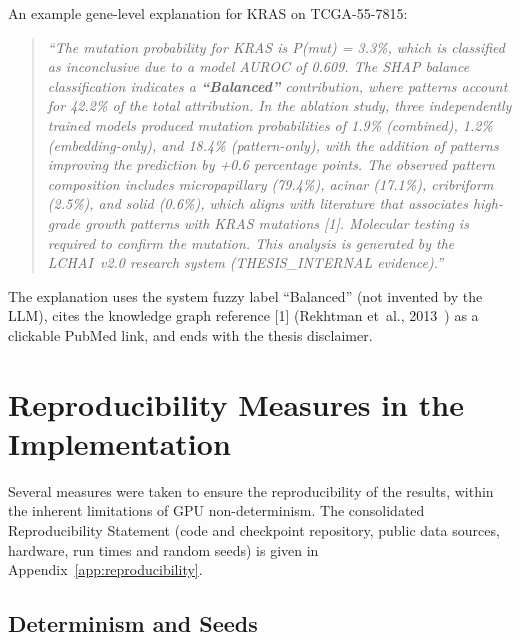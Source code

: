 An example gene-level explanation for KRAS on TCGA-55-7815:
\begin{quote}
\emph{``The mutation probability for KRAS is P(mut) = 3.3\%, which
is classified as inconclusive due to a model AUROC of 0.609.
The SHAP balance classification indicates a \textbf{``Balanced''}
contribution, where patterns account for 42.2\% of the total
attribution.
In the ablation study, three independently trained models produced
mutation probabilities of 1.9\% (combined), 1.2\% (embedding-only),
and 18.4\% (pattern-only), with the addition of patterns improving
the prediction by +0.6 percentage points.
The observed pattern composition includes micropapillary (79.4\%),
acinar (17.1\%), cribriform (2.5\%), and solid (0.6\%),
which aligns with literature that associates high-grade growth patterns
with KRAS mutations [1].
Molecular testing is required to confirm the mutation.
This analysis is generated by the LCHAI~v2.0 research system
(THESIS\_INTERNAL evidence).''}
\end{quote}

The explanation uses the system fuzzy label ``Balanced'' (not
invented by the LLM), cites the knowledge graph reference [1]
(Rekhtman et~al., 2013~\cite{rekhtman2013krassolid}) as a clickable
PubMed link, and ends with the thesis disclaimer.
 


\section{Reproducibility Measures in the Implementation}
\label{sec:impl:reproducibility}

Several measures were taken to ensure the reproducibility of the results, within the inherent limitations of GPU non-determinism.
The consolidated Reproducibility Statement (code and checkpoint repository, public data sources, hardware, run times and random seeds) is given in Appendix~\ref{app:reproducibility}.

\subsection{Determinism and Seeds}
\label{sec:impl:repro:seeds}

